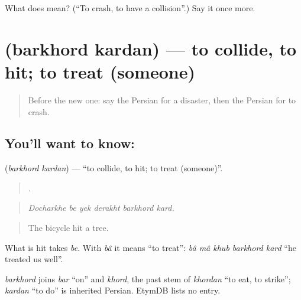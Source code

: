 \begin{tcolorbox}[breakable,colback=teal!4,colframe=teal!35!black,title={Before you move on}]
What does   mean? (\textquotedblleft{}To crash, to have a collision\textquotedblright{}.) Say it once more.
\end{tcolorbox}
\section[\texorpdfstring{\fa{برخورد} \fa{کردن} (barkhord kardan)}{برخورد کردن (barkhord kardan)}]{  (barkhord kardan) — to collide, to hit; to treat (someone)}

\label{lesson:FA-C324-barkhord-kardan}



\begin{quote}
Before the new one: say the Persian for a disaster, then the Persian for to crash.
\end{quote}

\subsection*{You'll want to know:  }
\textbf{ } (\emph{barkhord kardan}) — \textquotedblleft{}to collide, to hit; to treat (someone)\textquotedblright{}.

\begin{quote}
     .
\end{quote}

\begin{quote}
\emph{Docharkhe be yek derakht barkhord kard.}
\end{quote}

\begin{quote}
The bicycle hit a tree.
\end{quote}

What is hit takes \emph{be}. With \emph{bâ} it means \textquotedblleft{}to treat\textquotedblright{}: \emph{bâ mâ khub barkhord kard} \textquotedblleft{}he treated us well\textquotedblright{}.

\begin{cousinweb}
\emph{barkhord} joins \emph{bar} \textquotedblleft{}on\textquotedblright{} and \emph{khord}, the past stem of \emph{khordan} \textquotedblleft{}to eat, to strike\textquotedblright{}; \emph{kardan} \textquotedblleft{}to do\textquotedblright{} is inherited Persian. EtymDB lists no entry.
\end{cousinweb}

